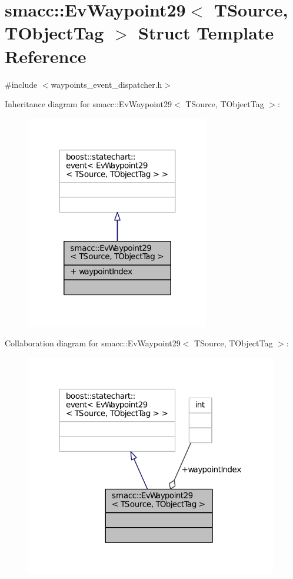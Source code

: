 \hypertarget{structsmacc_1_1EvWaypoint29}{}\section{smacc\+:\+:Ev\+Waypoint29$<$ T\+Source, T\+Object\+Tag $>$ Struct Template Reference}
\label{structsmacc_1_1EvWaypoint29}


{\ttfamily \#include $<$waypoints\+\_\+event\+\_\+dispatcher.\+h$>$}



Inheritance diagram for smacc\+:\+:Ev\+Waypoint29$<$ T\+Source, T\+Object\+Tag $>$\+:
\nopagebreak
\begin{figure}[H]
\begin{center}
\leavevmode
\includegraphics[width=227pt]{structsmacc_1_1EvWaypoint29__inherit__graph}
\end{center}
\end{figure}


Collaboration diagram for smacc\+:\+:Ev\+Waypoint29$<$ T\+Source, T\+Object\+Tag $>$\+:
\nopagebreak
\begin{figure}[H]
\begin{center}
\leavevmode
\includegraphics[width=312pt]{structsmacc_1_1EvWaypoint29__coll__graph}
\end{center}
\end{figure}
